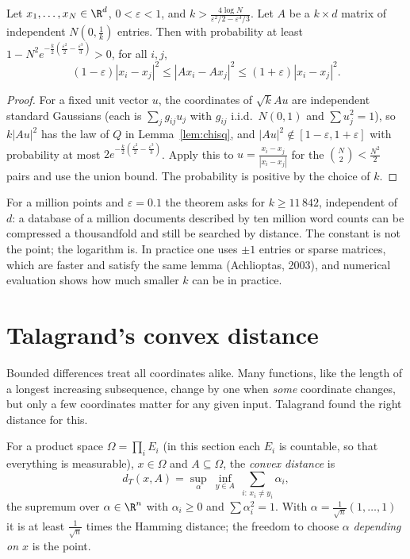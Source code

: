 \begin{theorem}\label{thm:jl}
Let $x_1,\dots,x_N\in\R^d$, $0<\varepsilon<1$, and $k>\frac{4\log N}{\varepsilon^2/2-\varepsilon^3/3}$. Let $A$ be a $k\times d$ matrix of independent $N(0,\frac1k)$ entries. Then with probability
at least $1-N^2e^{-\frac k2(\frac{\varepsilon^2}2-\frac{\varepsilon^3}3)}>0$, for all $i,j$,
\[
(1-\varepsilon)|x_i-x_j|^2\le|Ax_i-Ax_j|^2\le(1+\varepsilon)|x_i-x_j|^2.
\]
\end{theorem}
\begin{proof}
For a fixed unit vector $u$, the coordinates of $\sqrt kAu$ are independent standard Gaussians (each is $\sum_jg_{ij}u_j$ with $g_{ij}$ i.i.d.\ $N(0,1)$ and $\sum u_j^2=1$),
so $k|Au|^2$ has the law of $Q$ in Lemma~\ref{lem:chisq}, and $|Au|^2\notin[1-\varepsilon,1+\varepsilon]$ with probability at most $2e^{-\frac k2(\frac{\varepsilon^2}2-\frac{\varepsilon^3}3)}$. Apply this to
$u=\frac{x_i-x_j}{|x_i-x_j|}$ for the $\binom N2<\frac{N^2}2$ pairs and use the union bound. The probability is positive by the choice of $k$.
\end{proof}

For a million points and $\varepsilon=0.1$ the theorem asks for $k\ge11\,842$, independent of $d$: a database of a million documents described by ten million word counts
can be compressed a thousandfold and still be searched by distance. The constant is not the point; the logarithm is. In practice one uses $\pm1$ entries or sparse
matrices, which are faster and satisfy the same lemma (Achlioptas, 2003), and numerical evaluation shows how much smaller $k$ can be in practice.

\section{Talagrand's convex distance}

Bounded differences treat all coordinates alike. Many functions, like the length of a longest increasing subsequence, change by one when \emph{some} coordinate changes,
but only a few coordinates matter for any given input. Talagrand found the right distance for this.

For a product space $\Omega=\prod_iE_i$ (in this section each $E_i$ is countable, so that everything is measurable), $x\in\Omega$ and $A\subseteq\Omega$, the \emph{convex distance} is
\[
d_T(x,A)=\sup_{\alpha}\ \inf_{y\in A}\ \sum_{i:\,x_i\ne y_i}\alpha_i,
\]
the supremum over $\alpha\in\R^n$ with $\alpha_i\ge0$ and $\sum\alpha_i^2=1$. With $\alpha=\frac1{\sqrt n}(1,\dots,1)$ it is at least $\frac1{\sqrt n}$ times the Hamming distance; the freedom to
choose $\alpha$ \emph{depending on $x$} is the point.

